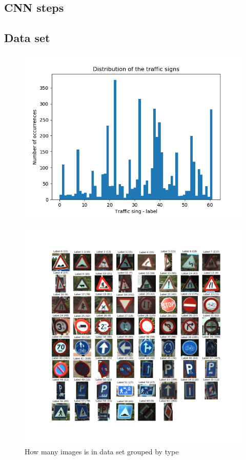 \documentclass[]{report}
\begin{document}
\subsection{CNN steps}
\subsection{Data set}
\begin{figure}[H]
\centering
\includegraphics[scale=0.8]{data_hist}
\end{figure}
\begin{figure}[H]
\centerline{\includegraphics[width=1.2\linewidth]{traffic_signs}}
\caption{How many images is in data set grouped by type}
\end{figure}
\end{document}
